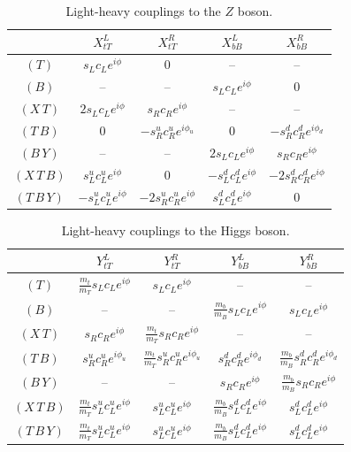 \documentclass[12pt,a4paper]{article}
\newcommand{\ts}{$(T)$}
\newcommand{\bs}{$(B)$}
\newcommand{\xt}{$(X\,T)$}
\newcommand{\tb}{$(T\,B)$}
\newcommand{\by}{$(B\,Y)$}
\newcommand{\xtb}{$(X\,T\,B)$}
\newcommand{\tby}{$(T\,B\,Y)$}
\newcommand{\slx}{s_L}
\newcommand{\slu}{s_L^u}
\newcommand{\sld}{s_L^d}
\newcommand{\clx}{c_L}
\newcommand{\clu}{c_L^u}
\newcommand{\cld}{c_L^d}
\newcommand{\srx}{s_R}
\newcommand{\sru}{s_R^u}
\newcommand{\srd}{s_R^d}
\newcommand{\crx}{c_R}
\newcommand{\cru}{c_R^u}
\newcommand{\crd}{c_R^d}
\begin{document}
\begin{table}[htb]
\begin{center}
\begin{tabular}{c|cccc}
& $X_{tT}^L$ & $X_{tT}^R$ & $X_{bB}^L$ & $X_{bB}^R$ 
\\ \hline
\ts & $\slx \clx e^{i\phi}$ & 0 & -- & --
\\
\bs & -- & -- & $\slx \clx e^{i\phi}$ & 0
\\
\xt & $2 \slx \clx e^{i\phi}$ & $\srx \crx e^{i\phi}$ & -- & --
\\
\tb & 0 & $-\sru \cru e^{i\phi_u}$ & 0 & $-\srd \crd e^{i\phi_d}$
\\
\by & -- & -- & $2\slx \clx e^{i\phi}$ & $\srx \crx e^{i\phi}$ 
\\
\xtb & $\slu \clu e^{i\phi}$ & 0 & $-\sld \cld e^{i\phi}$ & $-2\srd \crd e^{i\phi}$
\\
\tby & $-\slu \clu e^{i\phi}$ & $-2\sru \cru e^{i\phi}$ & $\sld \cld e^{i\phi}$ & 0 
%
\end{tabular}
\caption{Light-heavy couplings to the $Z$ boson.}
\label{tab:ZlH}
\end{center}
\end{table}

\clearpage

\begin{table}[htb]
\begin{center}
\begin{tabular}{c|cccc}
& $Y_{tT}^L$ & $Y_{tT}^R$ & $Y_{bB}^L$ & $Y_{bB}^R$  
\\ \hline
\ts & $\frac{m_t}{m_T} \slx \clx e^{i\phi}$ & $\slx \clx e^{i\phi}$ & -- & --
\\
\bs & -- & -- & $\frac{m_b}{m_B} \slx \clx e^{i\phi}$ & $\slx \clx e^{i\phi}$
\\
\xt & $\srx \crx e^{i\phi}$ & $\frac{m_t}{m_T} \srx \crx e^{i\phi}$ & -- & --
\\
\tb & $\sru \cru e^{i\phi_u}$ & $\frac{m_t}{m_T} \sru \cru e^{i\phi_u}$ & $\srd \crd e^{i\phi_d}$ & $\frac{m_b}{m_B} \srd \crd e^{i\phi_d}$
\\
\by & -- & -- & $\srx \crx e^{i\phi}$ & $\frac{m_b}{m_B} \srx \crx e^{i\phi}$ 
\\
\xtb & $\frac{m_t}{m_T} \slu \clu e^{i\phi}$  & $\slu \clu e^{i\phi}$ & $\frac{m_b}{m_B} \sld \cld e^{i\phi}$ & $\sld \cld e^{i\phi}$
\\
\tby & $\frac{m_t}{m_T} \slu \clu e^{i\phi}$ & $\slu \clu e^{i\phi}$ & $\frac{m_b}{m_B} \sld \cld e^{i\phi}$ & $\sld \cld e^{i\phi}$
%
\end{tabular}
\caption{Light-heavy couplings to the Higgs boson.}
\label{tab:HlH}
\end{center}
\end{table}
\end{document}
